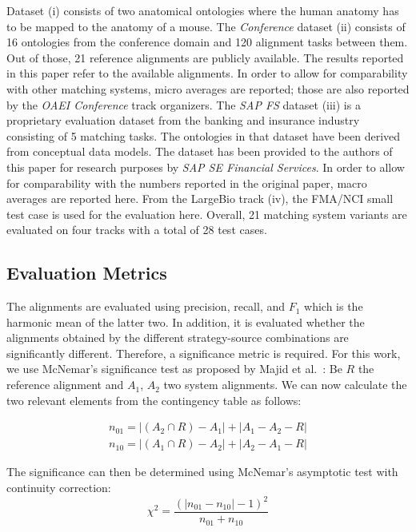 \documentclass[runningheads]{llncs}
\begin{document}
Dataset (i) consists of two anatomical ontologies where the human anatomy has to be mapped to the anatomy of a mouse. The \textit{Conference} dataset (ii) consists of 16 ontologies from the conference domain and 120 alignment tasks between them. Out of those, 21 reference alignments are publicly available. The results reported in this paper refer to the available alignments. In order to allow for comparability with other matching systems, micro averages are reported; those are also reported by the \textit{OAEI Conference} track organizers. 
The \textit{SAP FS} dataset (iii) is a proprietary evaluation dataset from the banking and insurance industry consisting of 5 matching tasks. The ontologies in that dataset have been derived from conceptual data models. The dataset has been provided to the authors of this paper for research purposes by \textit{SAP SE Financial Services}. In order to allow for comparability with the numbers reported in the original paper, macro averages are reported here. From the LargeBio track (iv), the FMA/NCI small test case is used for the evaluation here. Overall, 21 matching system variants are evaluated on four tracks with a total of 28 test cases.


\subsection{Evaluation Metrics}
The alignments are evaluated using precision, recall, and $F_1$ which is the harmonic mean of the latter two. In addition, it is evaluated whether the alignments obtained by the different strategy-source combinations are significantly different. Therefore, a significance metric is required. For this work, we use McNemar's significance test as proposed by Majid et al.~\cite{DBLP:journals/tkdd/MohammadiAHT18}: Be $R$ the reference alignment and $A_1$, $A_2$ two system alignments. We can now calculate the two relevant elements from the contingency table as follows:

\begin{equation}
\begin{split}
    n_{01} = |(A_2 \cap R) - A_1| + |A_1 - A_2 - R|\\
    n_{10} = |(A_1 \cap R) - A_2| + |A_2 - A_1 -R|
\end{split}
\end{equation}

\noindent The significance can then be determined using McNemar's asymptotic test with continuity correction: 
\begin{equation}
\chi^2 = \frac{(|n_{01} - n_{10}|-1)^2}{n_{01} + n_{10}}
\end{equation}
\end{document}
